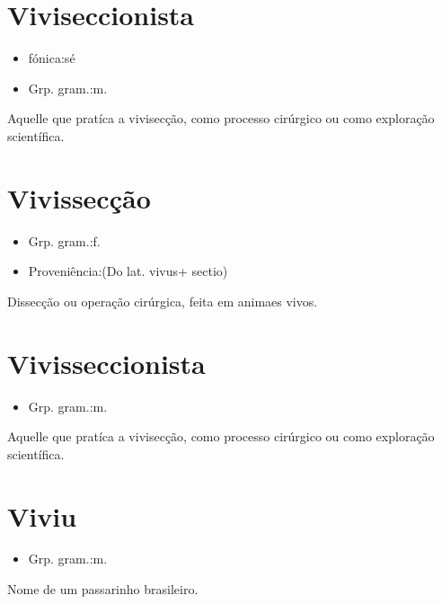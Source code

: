 \documentclass{article}
\begin{document}
\section{Viviseccionista}
\begin{itemize}
\item {fónica:sé}
\end{itemize}
\begin{itemize}
\item {Grp. gram.:m.}
\end{itemize}
Aquelle que pratíca a vivisecção, como processo cirúrgico ou como exploração scientífica.
\section{Vivissecção}
\begin{itemize}
\item {Grp. gram.:f.}
\end{itemize}
\begin{itemize}
\item {Proveniência:(Do lat. \textunderscore vivus\textunderscore  + \textunderscore sectio\textunderscore )}
\end{itemize}
Dissecção ou operação cirúrgica, feita em animaes vivos.
\section{Vivisseccionista}
\begin{itemize}
\item {Grp. gram.:m.}
\end{itemize}
Aquelle que pratíca a vivisecção, como processo cirúrgico ou como exploração scientífica.
\section{Viviu}
\begin{itemize}
\item {Grp. gram.:m.}
\end{itemize}
Nome de um passarinho brasileiro.
\end{document}
